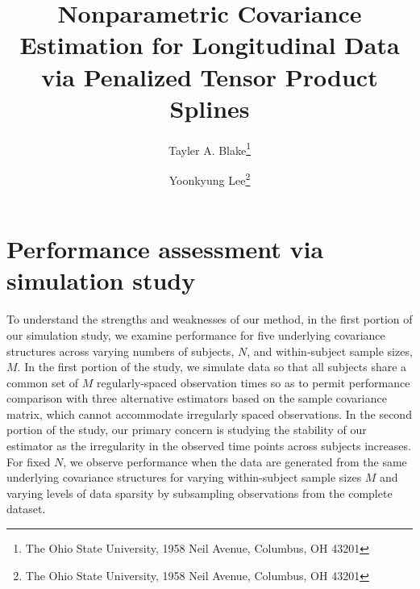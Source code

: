\documentclass[12pt]{article}
\theoremstyle{definition}
\def\bL{\mathbf{L}}
\begin{document}
\def\bL{\mathbf{L}}



\title{ Nonparametric Covariance Estimation for Longitudinal Data via Penalized Tensor Product Splines}

\author{Tayler A. Blake\thanks{The Ohio State University, 1958 Neil Avenue, Columbus, OH 43201} \and  Yoonkyung Lee\thanks{The Ohio State University, 1958 Neil Avenue, Columbus, OH 43201}}


\maketitle

\section{Performance assessment via simulation study}


To understand the strengths and weaknesses of our method, in the first portion of our simulation study, we examine performance for five underlying covariance structures across varying numbers of subjects, $N$, and within-subject sample sizes, $M$. In the first portion of the study, we simulate data so that all subjects share a common set of $M$ regularly-spaced observation times so as to permit performance comparison with three alternative estimators based on the sample covariance matrix, which cannot accommodate irregularly spaced observations.  In the second portion of the study, our primary concern is studying the stability of our estimator as the irregularity in the observed time points across subjects increases. For fixed $N$, we observe performance when the data are generated from the same underlying covariance structures for varying within-subject sample sizes $M$ and varying levels of data sparsity by subsampling observations from the complete dataset. 

\bigskip
\end{document}
